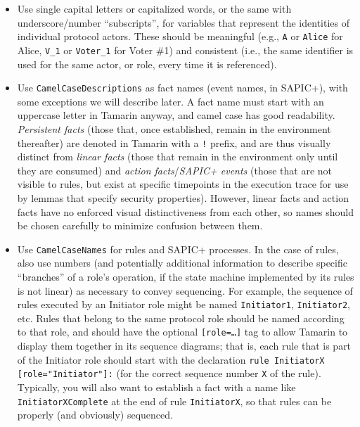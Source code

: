 \begin{itemize}

\item Use single capital letters or capitalized words, or the same with underscore/number ``subscripts'', for variables that represent the identities of individual protocol actors. These should be meaningful (e.g., \texttt{A} or \texttt{Alice} for Alice, \texttt{V\_1} or \texttt{Voter\_1} for Voter \#1) and consistent (i.e., the same identifier is used for the same actor, or role, every time it is referenced). 

\item Use \texttt{CamelCaseDescriptions} as fact names (event names, in SAPIC+), with some exceptions we will describe later. A fact name must start with an uppercase letter in Tamarin anyway, and camel case has good readability. \emph{Persistent facts} (those that, once established, remain in the environment thereafter) are denoted in Tamarin with a \texttt{!} prefix, and are thus visually distinct from \emph{linear facts} (those that remain in the environment only until they are consumed) and \emph{action facts}/\emph{SAPIC+ events} (those that are not visible to rules, but exist at specific timepoints in the execution trace for use by lemmas that specify security properties). However, linear facts and action facts have no enforced visual distinctiveness from each other, so names should be chosen carefully to minimize confusion between them.

\item Use \texttt{CamelCaseNames} for rules and SAPIC+ processes. In the case of rules, also use numbers (and potentially additional information to describe specific ``branches'' of a role's operation, if the state machine implemented by its rules is not linear) as necessary to convey sequencing. For example, the sequence of rules executed by an Initiator role might be named \texttt{Initiator1}, \texttt{Initiator2}, etc. Rules that belong to the same protocol role should be named according to that role, and should have the optional \texttt{[role=\ldots]} tag to allow Tamarin to display them together in its sequence diagrams; that is, each rule that is part of the Initiator role should start with the declaration \texttt{rule InitiatorX [role="Initiator"]:} (for the correct sequence number \texttt{X} of the rule). Typically, you will also want to establish a fact with a name like \texttt{InitiatorXComplete} at the end of rule \texttt{InitiatorX}, so that rules can be properly (and obviously) sequenced.


\end{itemize}
